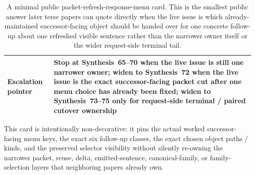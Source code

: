 \documentclass[11pt]{article}
\begin{document}
\begin{table}[t]
\begin{tabularx}{\linewidth}{@{}lX@{}}
Escalation pointer & Stop at Synthesis~65--70 when the live issue is still one narrower owner; widen to Synthesis~72 when the live issue is the exact successor-facing packet cut after one menu choice has already been fixed; widen to Synthesis~73--75 only for request-side terminal / paired cutover ownership \\
\bottomrule
\end{tabularx}
\caption{A minimal public packet-refresh-response-menu card. This is the smallest public answer later terse papers can quote directly when the live issue is which already-maintained successor-facing object should be handed over for one concrete follow-up about one refreshed visible sentence rather than the narrower owner itself or the wider request-side terminal tail.}
\label{tab:minimal-public-packet-refresh-response-menu-card}
\end{table}

This card is intentionally non-decorative: it pins the actual worked successor-facing menu keys, the exact six follow-up classes, the exact chosen object paths / kinds, and the preserved selector visibility without silently re-owning the narrower packet, reuse, delta, emitted-sentence, canonical-family, or family-selection layers that neighboring papers already own.\cite{series:workedexample}
\end{document}
